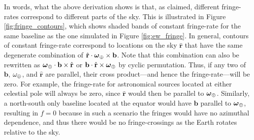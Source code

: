 \documentclass[twocolumn,apj,numberedappendix]{emulateapj}
\newcommand{\rhat}{\hat{\mathbf{r}}}
\begin{document}
In words, what the above derivation shows is that, as claimed, different fringe-rates correspond to different parts of the sky. This is illustrated in Figure \ref{fig:fringe_contours}, which shows shaded bands of constant fringe-rate for the same baseline as the one simulated in Figure \ref{fig:ew_fringe}. In general, contours of constant fringe-rate correspond to locations on the sky $\rhat$ that have the same degenerate combination of $\rhat \cdot \boldsymbol \omega_\Earth \times \mathbf{b} $. Note that this combination can also be rewritten as $\boldsymbol \omega_\Earth \cdot \mathbf{b} \times \rhat $ or $\mathbf{b} \cdot \rhat \times  \boldsymbol \omega_\Earth $ by cyclic permutation. Thus, if any two of $\mathbf{b}$, $\omega_\oplus$, and $\rhat$ are parallel, their cross product---and hence the fringe-rate---will be zero. For example, the fringe-rate for astronomical sources located at either celestial pole will always be zero, since $\rhat$ would then be parallel to $\boldsymbol \omega_\oplus$. Similarly, a north-south only baseline located at the equator would have $\mathbf{b}$ parallel to $\boldsymbol \omega_\oplus$, resulting in $f=0$ because in such a scenario the fringes would have no azimuthal dependence, and thus there would be no fringe-crossings as the Earth rotates relative to the sky.
\end{document}
